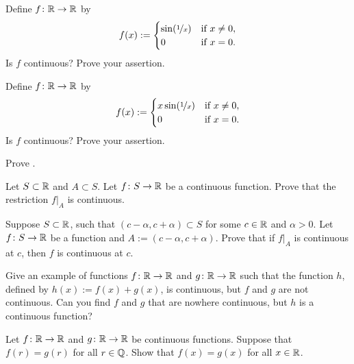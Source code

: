 \begin{exercise}
Define $f \colon {\mathbb{R}} \to {\mathbb{R}}$ by
\begin{equation*}
f(x) :=
\begin{cases}
\sin(\nicefrac{1}{x}) & \text{if } x \not= 0, \\
0 & \text{if } x=0.
\end{cases}
\avoidbreak
\end{equation*}
Is $f$ continuous?  Prove your assertion.
\end{exercise}

\begin{exercise}
Define $f \colon {\mathbb{R}} \to {\mathbb{R}}$ by
\begin{equation*}
f(x) :=
\begin{cases}
x \sin(\nicefrac{1}{x}) & \text{if } x \not= 0, \\
0 & \text{if } x=0.
\end{cases}
\avoidbreak
\end{equation*}
Is $f$ continuous?  Prove your assertion.
\end{exercise}

\begin{exercise}
Prove .
\end{exercise}

\begin{exercise} \label{exercise:restrictioncontinuous}
Let $S \subset {\mathbb{R}}$ and $A \subset S$.  Let $f \colon S \to {\mathbb{R}}$
be a continuous function.
Prove that the restriction $f|_A$ is continuous.
\end{exercise}

\begin{exercise}
Suppose $S \subset {\mathbb{R}}$, such that $(c-\alpha,c+\alpha) \subset S$ for some $c \in {\mathbb{R}}$
and $\alpha > 0$.
Let $f \colon S \to {\mathbb{R}}$ be a function and $A:=(c-\alpha,c+\alpha)$.  Prove that
if $f|_A$ is continuous at $c$, then $f$ is continuous at $c$.
\end{exercise}

\begin{exercise}
Give an example of functions $f \colon {\mathbb{R}} \to {\mathbb{R}}$ and $g \colon {\mathbb{R}} \to {\mathbb{R}}$
such that the function $h$, defined by $h(x) := f(x) + g(x)$, is continuous,
but $f$ and $g$ are not continuous.  Can you find $f$ and $g$ that are nowhere
continuous, but $h$ is a continuous function?
\end{exercise}

\begin{exercise}
Let $f \colon {\mathbb{R}} \to {\mathbb{R}}$ and 
$g \colon {\mathbb{R}} \to {\mathbb{R}}$ be continuous functions.  Suppose that
$f(r) = g(r)$ for all $r \in {\mathbb{Q}}$.
Show that $f(x) = g(x)$ for all $x \in {\mathbb{R}}$.
\end{exercise}

